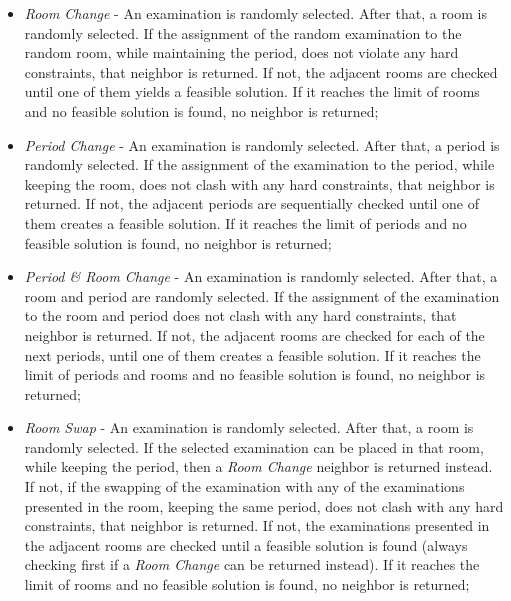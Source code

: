\begin{itemize}
	\item \textit{Room Change} - An examination is randomly selected. After that, a room is randomly selected. If the assignment of the random examination to the random room, while maintaining the period, does not violate any hard constraints, that neighbor is returned. If not, the adjacent rooms are checked until one of them yields a feasible solution. If it reaches the limit of rooms and no feasible solution is found, no neighbor is returned;\\
	
	\item \textit{Period Change} - An examination is randomly selected. After that, a period is randomly selected. If the assignment of the examination to the period, while keeping the room, does not clash with any hard constraints, that neighbor is returned. If not, the adjacent periods are sequentially checked until one of them creates a feasible solution. If it reaches the limit of periods and no feasible solution is found, no neighbor is returned;\\
	
	\item \textit{Period \& Room Change} - An examination is randomly selected. After that, a room and period are randomly selected. If the assignment of the examination to the room and period does not clash with any hard constraints, that neighbor is returned. If not, the adjacent rooms are checked for each of the next periods, until one of them creates a feasible solution. If it reaches the limit of periods and rooms and no feasible solution is found, no neighbor is returned;\\
	
	\item \textit{Room Swap} - An examination is randomly selected. After that, a room is randomly selected. If the selected examination can be placed in that room, while keeping the period, then a \textit{Room Change} neighbor is returned instead. If not, if the swapping of the examination with any of the examinations presented in the room, keeping the same period, does not clash with any hard constraints, that neighbor is returned. If not, the examinations presented in the adjacent rooms are checked until a feasible solution is found (always checking first if a \textit{Room Change} can be returned instead). If it reaches the limit of rooms and no feasible solution is found, no neighbor is returned;\\
	

\end{itemize}
